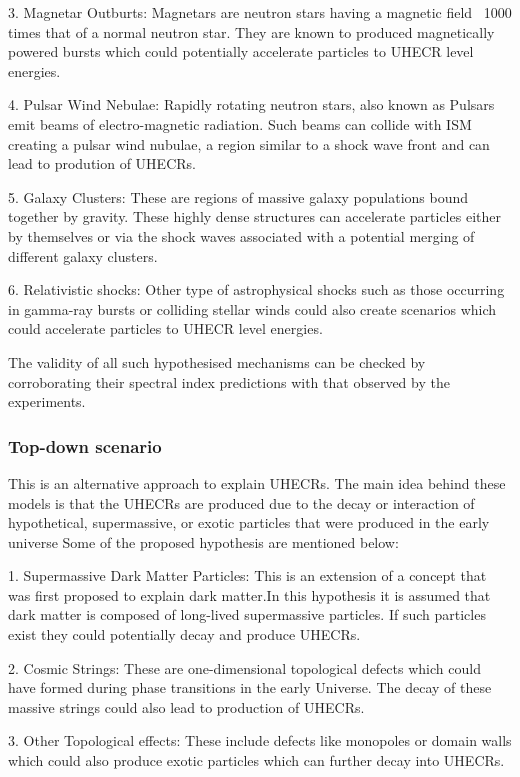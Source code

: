3. Magnetar Outburts: Magnetars are neutron stars having a magnetic field ~1000 times that of a normal neutron star. They are known to produced magnetically powered bursts which could potentially accelerate particles to UHECR level energies.

4. Pulsar Wind Nebulae: Rapidly rotating neutron stars, also known as Pulsars emit beams of electro-magnetic radiation. Such beams can collide with ISM creating a pulsar wind nubulae, a region similar to a shock wave front and can lead to prodution of UHECRs.

5. Galaxy Clusters: These are regions of massive galaxy populations bound together by gravity. These highly dense structures can accelerate particles either by themselves or via the shock waves associated with a potential merging of different galaxy clusters. 

6. Relativistic shocks: Other type of astrophysical shocks such as those occurring in gamma-ray bursts or colliding stellar winds could also create scenarios which could accelerate particles to UHECR level energies.

The validity of all such hypothesised mechanisms can be checked by corroborating their spectral index predictions with that observed by the experiments. 

\subsubsection{Top-down scenario}
\label{subsec:Tdownsce}
This is an alternative approach to explain UHECRs. The main idea behind these models is that the UHECRs are produced due to the decay or interaction of hypothetical, supermassive, or exotic particles that were produced in the early universe Some of the proposed hypothesis are mentioned below:


1. Supermassive Dark Matter Particles: This is an extension of a concept that was first proposed to explain dark matter.In this hypothesis it is assumed that dark matter is composed of long-lived supermassive particles. If such particles exist they could potentially decay and produce UHECRs.

2. Cosmic Strings: These are one-dimensional topological defects which could have formed during phase transitions in the early Universe. The decay of these massive strings could also lead to production of UHECRs.

3. Other Topological effects: These include defects like monopoles or domain walls which could also produce exotic particles which can further decay into UHECRs. 

